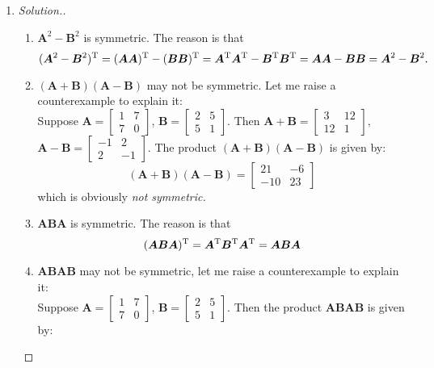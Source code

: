 \begin{enumerate}
\begin{proof}[Solution.]
\begin{enumerate}
\begin{equation}
\begin{split}
&=\bm I_{n} + \bm U\times\bm 0\times(\bm W - \bm V\bm A^{-1}\bm U)^{-1}\bm V\bm A^{-1} = \bm I_{n}
\end{split}
\end{equation}
\end{enumerate}
\end{proof}
\item
\begin{proof}[Solution.]
\begin{enumerate}
\item
$\bm A^2 - \bm B^2$ is symmetric. The reason is that 
\[
(\bm A^2 - \bm B^2)^{\mathrm T} = (\bm A\bm A)^{\mathrm T} - (\bm B\bm B)^{\mathrm T} = \bm A^{\mathrm T}\bm A^{\mathrm T} - \bm B^{\mathrm T}\bm B^{\mathrm T} = \bm A\bm A - \bm B\bm B = \bm A^{2} - \bm B^{2}.
\]
\item
$(\bm A + \bm B)(\bm A-\bm B)$ may not be symmetric. Let me raise a counterexample to explain it:\\
Suppose $\bm A = \begin{bmatrix}
1&7\\7&0
\end{bmatrix}$, $\bm B = \begin{bmatrix}
2&5\\5&1
\end{bmatrix}$. Then $\bm A+\bm B = \begin{bmatrix}
3&12\\12&1
\end{bmatrix},$ $\bm A-\bm B = \begin{bmatrix}
-1&2\\2&-1
\end{bmatrix}$. The product $(\bm A + \bm B)(\bm A-\bm B)$ is given by:
\[
(\bm A + \bm B)(\bm A-\bm B) = \begin{bmatrix}
21&-6\\-10&23
\end{bmatrix}
\]
which is obviously \textit{not symmetric.}
\item
$\bm{ABA}$ is symmetric. The reason is that 
\[
(\bm{ABA})^{\mathrm T} = \bm A^{\mathrm T}\bm B^{\mathrm T}\bm A^{\mathrm T} = \bm A\bm B\bm A
\]
\item
$\bm{ABAB}$ may not be symmetric, let me raise a counterexample to explain it:\\
Suppose $\bm A = \begin{bmatrix}
1&7\\7&0
\end{bmatrix}$, $\bm B = \begin{bmatrix}
2&5\\5&1
\end{bmatrix}$. Then the product $\bm{ABAB}$ is given by:

\end{enumerate}
\end{proof}
\end{enumerate}
